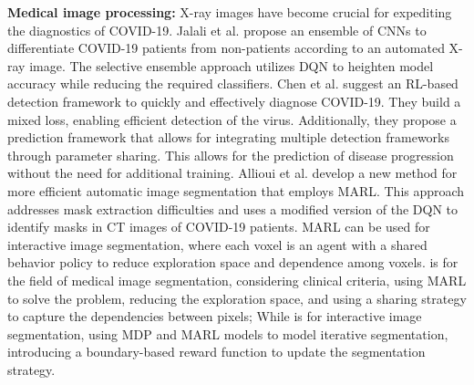 \documentclass[acmsmall]{acmart}
\begin{document}
\textbf{Medical image processing: }
X-ray images have become crucial for expediting the diagnostics of COVID-19. Jalali et al. \cite{JALALI2021107675} propose an ensemble of CNNs to differentiate COVID-19 patients from non-patients according to an automated X-ray image. The selective ensemble approach utilizes DQN to heighten model accuracy while reducing the required classifiers.
Chen et al. \cite{9855449} suggest an RL-based detection framework to quickly and effectively diagnose COVID-19. They build a mixed loss, enabling efficient detection of the virus. Additionally, they propose a prediction framework that allows for integrating multiple detection frameworks through parameter sharing. This allows for the prediction of disease progression without the need for additional training.
Allioui et al. \cite{jpm12020309} develop a new method for more efficient automatic image segmentation that employs MARL. This approach addresses mask extraction difficulties and uses a modified version of the DQN to identify masks in CT images of COVID-19 patients. %
MARL can be used for interactive image segmentation, where each voxel is an agent with a shared behavior policy to reduce exploration space and dependence among voxels. \cite{Liao_2020_CVPR} is for the field of medical image segmentation, considering clinical criteria, using MARL to solve the problem, reducing the exploration space, and using a sharing strategy to capture the dependencies between pixels;
While \cite{9311659} is for interactive image segmentation, using MDP and MARL models to model iterative segmentation, introducing a boundary-based reward function to update the segmentation strategy.
\end{document}
